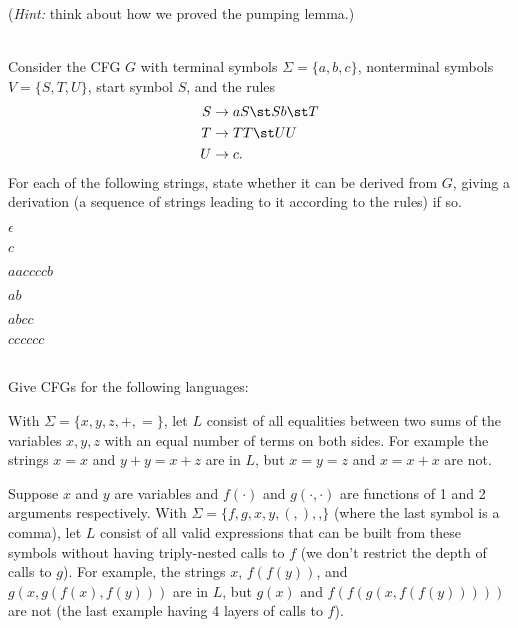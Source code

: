 \documentclass[11pt]{article}
\begin{document}
\begin{qunlist}
(\emph{Hint:} think about how we proved the pumping lemma.)

\newpage

\\
Consider the CFG $G$ with terminal symbols $\Sigma = \{ a, b, c \}$, nonterminal symbols $V = \{ S, T, U \}$, start symbol $S$, and the rules
\begin{align*}
S &\rightarrow aS \st Sb \st T \\
T &\rightarrow TT \st UU \\
U & \rightarrow c .
\end{align*}
For each of the following strings, state whether it can be derived from $G$, giving a derivation (a sequence of strings leading to it according to the rules) if so.

\begin{qparts}
\item $\epsilon$

\item $c$

\item $aaccccb$

\item $ab$

\item $abcc$

\item $cccccc$
\end{qparts}

\newpage 

\\
Give CFGs for the following languages:

\begin{qparts}
\item
With $\Sigma = \{ x, y, z, +, = \}$, let $L$ consist of all equalities between two sums of the variables $x, y, z$ with an equal number of terms on both sides.
For example the strings $x=x$ and $y+y=x+z$ are in $L$, but $x=y=z$ and $x=x+x$ are not.

\item
Suppose $x$ and $y$ are variables and $f(\cdot)$ and $g(\cdot, \cdot)$ are functions of 1 and 2 arguments respectively.
With $\Sigma = \{ f, g, x, y, (, ), \textbf{,} \}$ (where the last symbol is a comma), let $L$ consist of all valid expressions that can be built from these symbols without having triply-nested calls to $f$ (we don't restrict the depth of calls to $g$).
For example, the strings $x$, $f(f(y))$, and $g(x, g(f(x), f(y)))$ are in $L$, but $g(x)$ and $f(f(g(x, f(f(y)))))$ are not (the last example having 4 layers of calls to $f$).


\end{qparts}
\end{qunlist}
\end{document}
